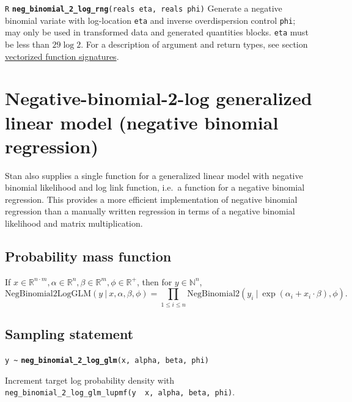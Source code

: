 \documentclass[
  10pt,
]{book}
\begin{document}

\texttt{R} \textbf{\texttt{neg\_binomial\_2\_log\_rng}}\texttt{(reals\ eta,\ reals\ phi)}\newline
Generate a negative binomial variate with log-location \texttt{eta} and inverse
overdispersion control \texttt{phi}; may only be used in transformed data and generated
quantities blocks. \texttt{eta} must be less than \(29 \log 2\). For a description of
argument and return types, see section \protect\hyperlink{prob-vectorization}{vectorized function signatures}.

\hypertarget{neg-binom-2-log-glm}{%
\section{Negative-binomial-2-log generalized linear model (negative binomial regression)}\label{neg-binom-2-log-glm}}

Stan also supplies a single function for a generalized linear model
with negative binomial likelihood and log link function, i.e.~a
function for a negative binomial regression. This provides a
more efficient implementation of negative binomial regression than a
manually written regression in terms of a negative binomial likelihood
and matrix multiplication.

\hypertarget{probability-mass-function-12}{%
\subsection{Probability mass function}\label{probability-mass-function-12}}

If \(x\in \mathbb{R}^{n\cdot m}, \alpha \in \mathbb{R}^n, \beta\in \mathbb{R}^m, \phi\in \mathbb{R}^+\), then for \(y \in \mathbb{N}^n\), \[
\text{NegBinomial2LogGLM}(y~|~x, \alpha, \beta, \phi) = \prod_{1\leq i
\leq n}\text{NegBinomial2}(y_i~|~\exp(\alpha_i + x_i\cdot \beta),
\phi). \]

\hypertarget{sampling-statement-16}{%
\subsection{Sampling statement}\label{sampling-statement-16}}

\texttt{y\ \textasciitilde{}} \textbf{\texttt{neg\_binomial\_2\_log\_glm}}\texttt{(x,\ alpha,\ beta,\ phi)}

Increment target log probability density with \texttt{neg\_binomial\_2\_log\_glm\_lupmf(y\ \textbar{}\ x,\ alpha,\ beta,\ phi)}.
\end{document}
